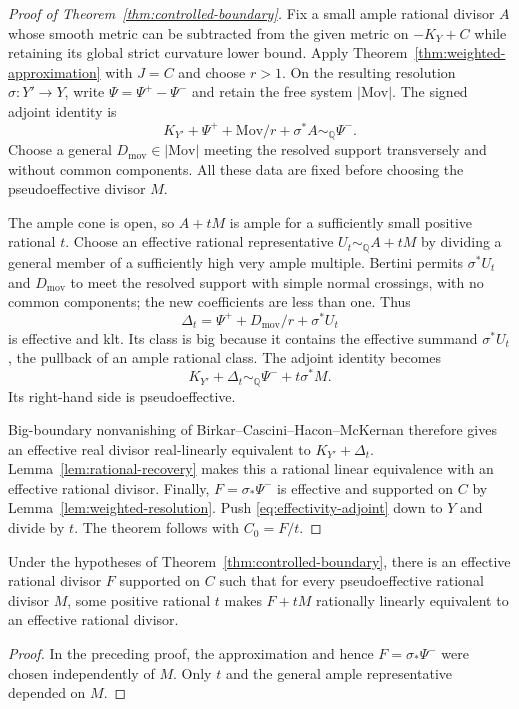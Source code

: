 \begin{proof}[Proof of Theorem~\ref{thm:controlled-boundary}]
Fix a small ample rational divisor $A$ whose smooth metric can be
subtracted from the given metric on $-K_Y+C$ while retaining its global
strict curvature lower bound.  Apply
Theorem~\ref{thm:weighted-approximation} with $J=C$ and choose $r>1$.
On the resulting resolution $\sigma:Y'\to Y$, write
$\Psi=\Psi^+-\Psi^-$ and retain the free system $|\mathrm{Mov}|$.
The signed adjoint identity is
\[
 K_{Y'}+\Psi^++\mathrm{Mov}/r+\sigma^*A
       \sim_{\mathbb Q}\Psi^-.
\]
Choose a general $D_{\mathrm{mov}}\in|\mathrm{Mov}|$ meeting the
resolved support transversely and without common components.
All these data are fixed before choosing the pseudoeffective divisor $M$.

The ample cone is open, so $A+tM$ is ample for a sufficiently small
positive rational $t$.  Choose an effective rational representative
$U_t\sim_{\mathbb Q}A+tM$ by dividing a general member of a sufficiently
high very ample multiple.  Bertini permits $\sigma^*U_t$ and $D_{\mathrm{mov}}$ to meet
the resolved support with simple normal crossings, with no common
components; the new coefficients are less than one.  Thus
\begin{equation}\label{eq:effective-big-boundary}
 \Delta_t=\Psi^++D_{\mathrm{mov}}/r+\sigma^*U_t
\end{equation}
is effective and klt.  Its class is big because it contains the
effective summand $\sigma^*U_t$, the pullback of an ample rational class.
The adjoint identity becomes
\begin{equation}\label{eq:effectivity-adjoint}
 K_{Y'}+\Delta_t\sim_{\mathbb Q}\Psi^-+t\sigma^*M.
\end{equation}
Its right-hand side is pseudoeffective.

Big-boundary nonvanishing of Birkar--Cascini--Hacon--McKernan
\cite[Theorem D]{BCHM2010} therefore gives an effective real divisor
real-linearly equivalent to $K_{Y'}+\Delta_t$.
Lemma~\ref{lem:rational-recovery} makes this a rational linear
equivalence with an effective rational divisor.  Finally,
$F=\sigma_*\Psi^-$ is effective and supported on $C$ by
Lemma~\ref{lem:weighted-resolution}.  Push
\eqref{eq:effectivity-adjoint} down to $Y$ and divide by $t$.
The theorem follows with $C_0=F/t$.
\end{proof}

\begin{proposition}
\label{prop:ample-perturbation}
Under the hypotheses of Theorem~\ref{thm:controlled-boundary}, there
is an effective rational divisor $F$ supported on $C$ such that for
every pseudoeffective rational divisor $M$, some positive rational
$t$ makes $F+tM$ rationally linearly equivalent to an effective
rational divisor.
\end{proposition}
\begin{proof}
In the preceding proof, the approximation and hence
$F=\sigma_*\Psi^-$ were chosen independently of $M$.  Only $t$ and the
general ample representative depended on $M$.
\end{proof}

